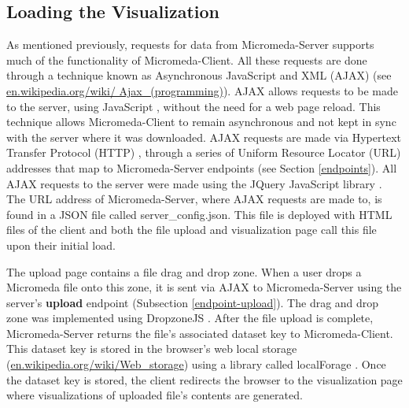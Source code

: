 \subsection{Loading the Visualization}

As mentioned previously, requests for data from Micromeda-Server supports much of the functionality of Micromeda-Client. All these requests are done through a technique known as Asynchronous JavaScript and XML (AJAX) \cite{garrett2005ajax,li2012jquery} (see \href{en.wikipedia.org/wiki/Ajax\_(programming)}{en.wikipedia.org/wiki/ Ajax\_(programming)}). AJAX allows requests to be made to the server, using JavaScript \cite{flanagan2006javascript}, without the need for a web page reload. This technique allows Micromeda-Client to remain asynchronous and not kept in sync with the server where it was downloaded. AJAX requests are made via Hypertext Transfer Protocol (HTTP) \cite{fielding1999hypertext}, through a series of Uniform Resource Locator (URL) addresses \cite{berners1994rfc} that map to Micromeda-Server endpoints (see Section \ref{endpoints}). All AJAX requests to the server were made using the JQuery JavaScript library \cite{chaffer2013learning,li2012jquery}. The URL address of Micromeda-Server, where AJAX requests are made to, is found in a JSON file called server\_config.json. This file is deployed with HTML files of the client and both the file upload and visualization page call this file upon their initial load.

The upload page contains a file drag and drop zone. When a user drops a Micromeda file onto this zone, it is sent via AJAX to Micromeda-Server using the server's \textbf{upload} endpoint (Subsection \ref{endpoint-upload}). The drag and drop zone was implemented using DropzoneJS \cite{meno}. After the file upload is complete, Micromeda-Server returns the file's associated dataset key to Micromeda-Client. This dataset key is stored in the browser's web local storage \cite{Hickson} (\href{en.wikipedia.org/wiki/Web\_storage}{en.wikipedia.org/wiki/Web\_storage}) using a library called localForage \cite{localforage}. Once the dataset key is stored, the client redirects the browser to the visualization page where visualizations of uploaded file's contents are generated.

